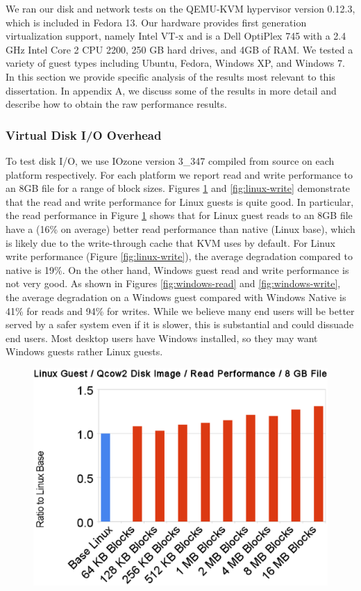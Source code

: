 We ran our disk and network tests on the QEMU-KVM hypervisor version 0.12.3, which is included in Fedora 13. Our hardware provides first generation virtualization support, namely Intel VT-x and is a Dell OptiPlex 745 with a 2.4 GHz Intel Core 2 CPU 2200, 250 GB hard drives, and 4GB of RAM. We tested a variety of guest types including Ubuntu, Fedora, Windows XP, and Windows 7. In this section we provide specific analysis of the results most relevant to this dissertation. In appendix A, we discuss some of the results in more detail and describe how to obtain the raw performance results.

\subsubsection{Virtual Disk I/O Overhead}
To test disk I/O, we use IOzone version 3\_347 compiled from source on each platform respectively. For each platform we report read and write performance to an 8GB file for a range of block sizes. Figures \ref{fig:linux-read} and \ref{fig:linux-write} demonstrate that the read and write performance for Linux guests is quite good. In particular, the read performance in Figure \ref{fig:linux-read} shows that for Linux guest reads to an 8GB file have a (16\% on average) better read performance than native (Linux base), which is likely due to the write-through cache that KVM uses by default. For Linux write performance (Figure \ref{fig:linux-write}), the average degradation compared to native is 19\%. On the other hand, Windows guest read and write performance is not very good.  As shown in Figures \ref{fig:windows-read} and \ref{fig:windows-write}, the average degradation on a Windows guest compared with Windows Native is 41\% for reads and 94\% for writes. While we believe many end users will be better served by a safer system even if it is slower, this is substantial and could dissuade end users. Most desktop users have Windows installed, so they may want Windows guests rather Linux guests.

\begin{figure}[tbp]
\begin{centering}
\label{fig:linux-read}
\includegraphics[scale=.7,angle=90]{figs/linux-read}
\end{centering}
\end{figure}

